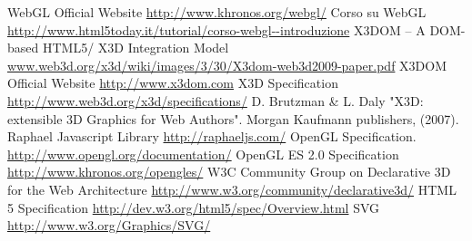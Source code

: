  WebGL Official Website \url{http://www.khronos.org/webgl/}
 Corso su WebGL \url{http://www.html5today.it/tutorial/corso-webgl--introduzione}
 X3DOM – A DOM-based HTML5/ X3D Integration Model \url{www.web3d.org/x3d/wiki/images/3/30/X3dom-web3d2009-paper.pdf}
 X3DOM Official Website \url{http://www.x3dom.com}
 X3D Specification \url{http://www.web3d.org/x3d/specifications/}
 D. Brutzman \& L. Daly "X3D: extensible 3D Graphics for Web Authors". Morgan Kaufmann publishers, (2007).
 Raphael Javascript Library \url{http://raphaeljs.com/}
 OpenGL Specification. \url{http://www.opengl.org/documentation/}
 OpenGL ES 2.0 Specification \url{http://www.khronos.org/opengles/}
 W3C Community Group on Declarative 3D for the Web Architecture \url{http://www.w3.org/community/declarative3d/}
 HTML 5 Specification \url{http://dev.w3.org/html5/spec/Overview.html}
 SVG \url{http://www.w3.org/Graphics/SVG/}
